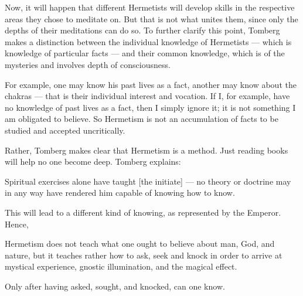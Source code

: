 Now, it will happen that different Hermetists will develop skills in the respective areas they chose to meditate on. But
that is not what unites them, since only the depths of their meditations can do so. To further clarify this point,
Tomberg makes a distinction between the individual knowledge of Hermetists — which is knowledge of
particular facts — and their common knowledge, which is of the mysteries and involves depth of
consciousness.

For example, one may know his past lives as a fact, another may know about the chakras — that is their
individual interest and vocation. If I, for example, have no knowledge of past lives as a fact, then I simply ignore
it; it is not something I am obligated to believe. So Hermetism is not an accumulation of facts to be studied and
accepted uncritically.

Rather, Tomberg makes clear that Hermetism is a method. Just reading books will help no one become deep. Tomberg
explains:

\begin{quotex}
Spiritual exercises alone have taught [the initiate] — no theory or doctrine may in any way have rendered
him capable of knowing how to know. 

\end{quotex}
This will lead to a different kind of knowing, as represented by the Emperor. Hence,

\begin{quotex}
Hermetism does not teach what one ought to believe about man, God, and nature, but it teaches rather how to ask, seek
and knock in order to arrive at mystical experience, gnostic illumination, and the magical effect.

\end{quotex}

Only after having asked, sought, and knocked, can one know.


